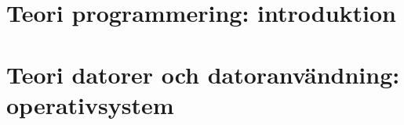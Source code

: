 
\renewcommand{\vecka}{1}



\clearpage\section{Teori programmering: introduktion}


\clearpage\section{Teori datorer och datoranvändning: operativsystem}








